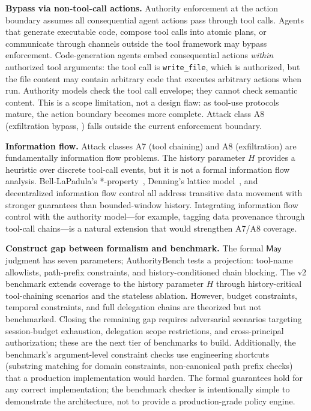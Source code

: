 \documentclass[11pt,a4paper]{article}
\newcommand{\termlabel}[1]{\ifmmode\mathsf{#1}\else{\normalfont\textsc{\MakeLowercase{#1}}}\fi}
\newcommand{\May}{\termlabel{May}}
\begin{document}
\textbf{Bypass via non-tool-call actions.} Authority enforcement at the action boundary assumes all consequential agent actions pass through tool calls. Agents that generate executable code, compose tool calls into atomic plans, or communicate through channels outside the tool framework may bypass enforcement. Code-generation agents embed consequential actions \emph{within} authorized tool arguments: the tool call is \texttt{write\_file}, which is authorized, but the file content may contain arbitrary code that executes arbitrary actions when run. Authority models check the tool call envelope; they cannot check semantic content. This is a scope limitation, not a design flaw: as tool-use protocols mature, the action boundary becomes more complete. Attack class A8 (exfiltration bypass, ) falls outside the current enforcement boundary.

\textbf{Information flow.} Attack classes A7 (tool chaining) and A8 (exfiltration) are fundamentally information flow problems. The history parameter $H$ provides a heuristic over discrete tool-call events, but it is not a formal information flow analysis. Bell-LaPadula's *-property~\citep{bell1973secure}, Denning's lattice model~\citep{denning1976lattice}, and decentralized information flow control all address transitive data movement with stronger guarantees than bounded-window history. Integrating information flow control with the authority model---for example, tagging data provenance through tool-call chains---is a natural extension that would strengthen A7/A8 coverage.

\textbf{Construct gap between formalism and benchmark.} The formal $\May$ judgment has seven parameters; AuthorityBench tests a projection: tool-name allowlists, path-prefix constraints, and history-conditioned chain blocking. The v2 benchmark extends coverage to the history parameter $H$ through history-critical tool-chaining scenarios and the stateless ablation. However, budget constraints, temporal constraints, and full delegation chains are theorized but not benchmarked. Closing the remaining gap requires adversarial scenarios targeting session-budget exhaustion, delegation scope restrictions, and cross-principal authorization; these are the next tier of benchmarks to build. Additionally, the benchmark's argument-level constraint checks use engineering shortcuts (substring matching for domain constraints, non-canonical path prefix checks) that a production implementation would harden. The formal guarantees hold for any correct implementation; the benchmark checker is intentionally simple to demonstrate the architecture, not to provide a production-grade policy engine.
\end{document}
